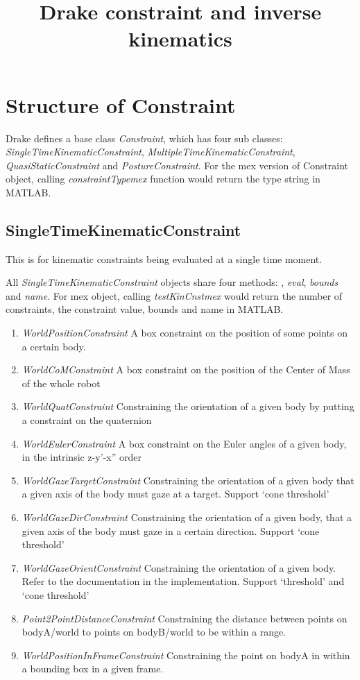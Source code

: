 \documentclass{article}
\title{Drake constraint and inverse kinematics}
\begin{document}
\maketitle
\section{Structure of Constraint}
Drake defines a base class \textsl{Constraint}, which has four sub classes: \textsl{SingleTimeKinematicConstraint}, \textsl{MultipleTimeKinematicConstraint}, \textsl{QuasiStaticConstraint} and \textsl{PostureConstraint}. For the mex version of Constraint object, calling \textsl{constraintTypemex} function would return the type string in MATLAB. 

\subsection{SingleTimeKinematicConstraint}
This is for kinematic constraints being evaluated at a single time moment.

All \textsl{SingleTimeKinematicConstraint} objects share four methods: , \textsl{eval}, \textsl{bounds} and \textsl{name}. For mex object, calling \textsl{testKinCnstmex} would return the number of constraints, the constraint value, bounds and name in MATLAB.
\begin{enumerate}
\item \textsl{WorldPositionConstraint} A box constraint on the position of some points on a certain body.
\item \textsl{WorldCoMConstraint} A box constraint on the position of the Center of Mass of the whole robot
\item \textsl{WorldQuatConstraint} Constraining the orientation of a given body by putting a constraint on the quaternion
\item \textsl{WorldEulerConstraint} A box constraint on the Euler angles of a given body, in the intrinsic z-y'-x'' order
\item \textsl{WorldGazeTargetConstraint} Constraining the orientation of a given body that a given axis of the body must gaze at a target. Support `cone threshold'
\item \textsl{WorldGazeDirConstraint} Constraining the orientation of a given body, that a given axis of the body must gaze in a certain direction. Support `cone threshold'
\item \textsl{WorldGazeOrientConstraint} Constraining the orientation of a given body. Refer to the documentation in the implementation. Support `threshold' and `cone threshold'
\item \textsl{Point2PointDistanceConstraint} Constraining the distance between points on bodyA/world to points on bodyB/world to be within a range.
\item \textsl{WorldPositionInFrameConstraint} Constraining the point on bodyA in within a bounding box in a given frame.
\end{enumerate}
\end{document}
